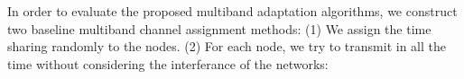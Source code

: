 


In order to evaluate the proposed multiband adaptation algorithms, 
we construct two baseline multiband channel assignment methods: (1) We assign the
time sharing randomly to the nodes. (2) For each node, we try to transmit in all the time without considering the interferance of the networks: 










